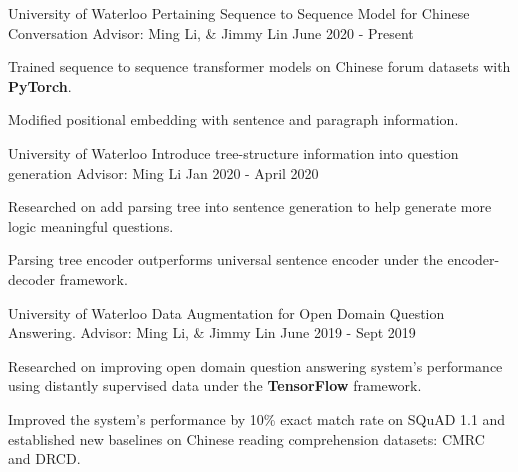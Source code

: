 

\begin{cventries}


 \cventry
    {University of Waterloo}
    {Pertaining Sequence to Sequence Model for Chinese Conversation} %
    {Advisor: Ming Li, \& Jimmy Lin} %
    {June 2020 - Present} %
    {
      \begin{cvitems} %
        \item {Trained sequence to sequence transformer models on Chinese forum datasets with \textbf{PyTorch}.}
        \item {Modified positional embedding with sentence and paragraph information.}
      \end{cvitems}
    }
    
   \cventry
    {University of Waterloo}
    {Introduce tree-structure information into question generation} %
    {Advisor: Ming Li} %
    {Jan 2020 - April 2020} %
    {
      \begin{cvitems} %
        \item {Researched on add parsing tree into sentence generation to help generate more logic meaningful questions.}
        \item {Parsing tree encoder outperforms universal sentence encoder under the encoder-decoder framework.}
      \end{cvitems}
    }
    
 \cventry
    {University of Waterloo}
    {Data Augmentation for Open Domain Question Answering.} %
    {Advisor: Ming Li, \& Jimmy Lin} %
    {June 2019 - Sept 2019} %
    {
      \begin{cvitems} %
        \item {Researched on improving open domain question answering system's performance using distantly supervised data under the \textbf{TensorFlow} framework.}
        \item {Improved the system's performance by 10\% exact match rate on SQuAD 1.1 and established new baselines on Chinese reading comprehension datasets: CMRC and DRCD.}
      \end{cvitems}
    }
    

\end{cventries}
